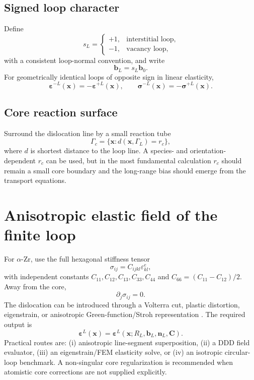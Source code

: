 \documentclass[11pt]{article}
\newcommand{\beps}{\bm{\varepsilon}}
\newcommand{\bsigma}{\bm{\sigma}}
\newcommand{\bx}{\bm{x}}
\newcommand{\bn}{\bm{n}}
\newcommand{\bb}{\bm{b}}
\newcommand{\cG}{\Gamma}
\begin{document}
\subsection{Signed loop character}
Define
\begin{equation}
s_L=\begin{cases}+1,&\text{interstitial loop},\\-1,&\text{vacancy loop},\end{cases}
\end{equation}
with a consistent loop-normal convention, and write
\begin{equation}
\bb_L=s_L\bb_0.
\end{equation}
For geometrically identical loops of opposite sign in linear elasticity,
\begin{equation}
\beps^{-L}(\bx)=-\beps^{+L}(\bx),\qquad \bsigma^{-L}(\bx)=-\bsigma^{+L}(\bx).
\end{equation}

\subsection{Core reaction surface}
Surround the dislocation line by a small reaction tube
\begin{equation}
\cG_c=\{\bx:d(\bx,\cG_L)=r_c\},
\end{equation}
where $d$ is shortest distance to the loop line. A species- and orientation-dependent $r_c$ can be used, but in the most fundamental calculation $r_c$ should remain a small core boundary and the long-range bias should emerge from the transport equations.

\section{Anisotropic elastic field of the finite loop}
For $\alpha$-Zr, use the full hexagonal stiffness tensor
\begin{equation}
\sigma_{ij}=C_{ijkl}\varepsilon_{kl}^{e},
\end{equation}
with independent constants $C_{11},C_{12},C_{13},C_{33},C_{44}$ and $C_{66}=(C_{11}-C_{12})/2$. Away from the core,
\begin{equation}
\partial_j\sigma_{ij}=0.
\end{equation}
The dislocation can be introduced through a Volterra cut, plastic distortion, eigenstrain, or anisotropic Green-function/Stroh representation \cite{HirthLothe,Mura}. The required output is
\begin{equation}
\boxed{\beps^L(\bx)=\beps^L(\bx;R_L,\bb_L,\bn_L,\mathbf C)}.
\end{equation}
Practical routes are: (i) anisotropic line-segment superposition, (ii) a DDD field evaluator, (iii) an eigenstrain/FEM elasticity solve, or (iv) an isotropic circular-loop benchmark. A non-singular core regularization is recommended when atomistic core corrections are not supplied explicitly.
\end{document}
